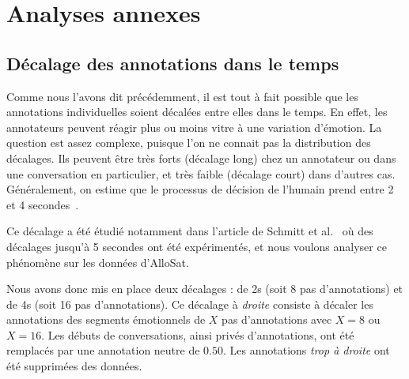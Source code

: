 \section{Analyses annexes}


\subsection{Décalage des annotations dans le temps}

Comme nous l'avons dit précédemment, il est tout à fait possible que les annotations individuelles soient décalées entre elles dans le temps. En effet, les annotateurs peuvent réagir plus ou moins vitre à une variation d'émotion.
La question est assez complexe, puisque l'on ne connait pas la distribution des décalages. Ils peuvent être très forts (décalage long) chez un annotateur ou dans une conversation en particulier, et très faible (décalage court) dans d'autres cas. Généralement, on estime que le processus de décision de l'humain prend entre 2 et 4 secondes~\cite{Huang2015,Mariooryad2014}.

Ce décalage a été étudié notamment dans l'article de Schmitt et al.~\cite{Schmitt2019} où des décalages jusqu'à 5 secondes ont été expérimentés, et nous voulons analyser ce phénomène sur les données d'AlloSat.

Nous avons donc mis en place deux décalages : de 2s (soit 8 pas d'annotations) et de 4s (soit 16 pas d'annotations). Ce décalage à \textit{droite} consiste à décaler les annotations des segments émotionnels de $X$ pas d'annotations avec $X=8$ ou $X=16$. Les débuts de conversations, ainsi privés d'annotations, ont été remplacés par une annotation neutre de $0.50$. Les annotations \textit{trop à droite} ont été supprimées des données.



